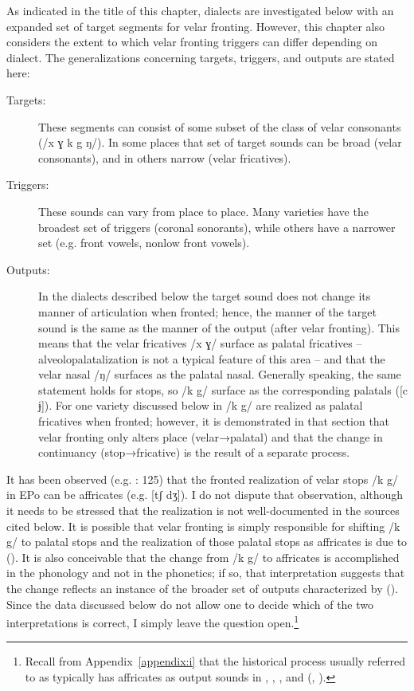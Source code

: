 As indicated in the title of this chapter, dialects are investigated below with an expanded set of target segments for velar fronting. However, this chapter also considers the extent to which velar fronting triggers can differ depending on dialect. The generalizations concerning targets, triggers, and outputs are stated here:

\begin{description}
\item[Targets:] These segments can consist of some subset of the class of velar consonants (/x ɣ k g ŋ/). In some places that set of target sounds can be broad (velar consonants), and in others narrow (velar fricatives).

\item[Triggers:] These sounds can vary from place to place. Many varieties have the broadest set of triggers (coronal sonorants), while others have a narrower set (e.g. front vowels, nonlow front vowels).

\item[Outputs:]\sloppy In the dialects described below the target sound does not change its manner of articulation when fronted; hence, the manner of the target sound is the same as the manner  of the output (after velar fronting). This means that the velar fricatives /x ɣ/ surface as palatal fricatives -- alveolopalatalization is not a typical feature of this area -- and that the velar nasal /ŋ/ surfaces as the palatal nasal. Generally speaking, the same statement holds for stops, so /k g/ surface as the corresponding palatals ([c ɉ]). For one variety discussed below in  /k g/ are realized as palatal fricatives when fronted; however, it is demonstrated in that section that velar fronting only alters place (velar→palatal) and that the change in continuancy (stop→fricative) is the result of a separate process.
\end{description}

It has been observed (e.g. \citealt{Mitzka1943}: 125) that the fronted realization of velar stops /k g/ in EPo can be affricates (e.g. [tʃ dʒ]). I do not dispute that observation, although it needs to be stressed that the  realization is not well-documented in the sources cited below. It is possible that velar fronting is simply responsible for shifting /k g/ to palatal stops and the realization of those palatal stops as affricates is due to  (). It is also conceivable that the change from /k g/ to affricates is accomplished in the phonology and not in the phonetics; if so, that interpretation suggests that the change reflects an instance of the broader set of outputs characterized by  (). Since the data discussed below do not allow one to decide which of the two interpretations is correct, I simply leave the question open.\footnote{{Recall from Appendix~\ref{appendix:i} that the historical process usually referred to as  typically has affricates as output sounds in , , , and  (, ).} }

